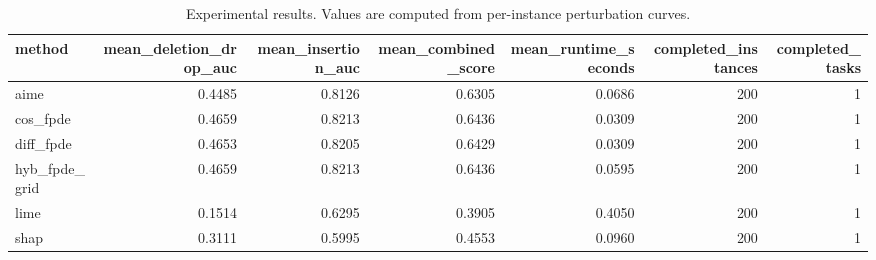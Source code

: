 \begin{table}[t]
\caption{Experimental results. Values are computed from per-instance perturbation curves.}
\label{tab:main_results_computed}
\centering
\begin{tabular}{lrrrrrr}
\toprule
method & mean\_deletion\_drop\_auc & mean\_insertion\_auc & mean\_combined\_score & mean\_runtime\_seconds & completed\_instances & completed\_tasks \\
\midrule
aime & 0.4485 & 0.8126 & 0.6305 & 0.0686 & 200 & 1 \\
cos\_fpde & 0.4659 & 0.8213 & 0.6436 & 0.0309 & 200 & 1 \\
diff\_fpde & 0.4653 & 0.8205 & 0.6429 & 0.0309 & 200 & 1 \\
hyb\_fpde\_grid & 0.4659 & 0.8213 & 0.6436 & 0.0595 & 200 & 1 \\
lime & 0.1514 & 0.6295 & 0.3905 & 0.4050 & 200 & 1 \\
shap & 0.3111 & 0.5995 & 0.4553 & 0.0960 & 200 & 1 \\
\bottomrule
\end{tabular}

\end{table}

